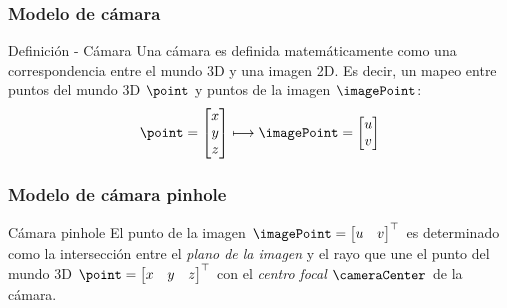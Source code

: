 
\begin{frame}
\frametitle{Modelo de cámara}

\begin{block}{Definición - Cámara}
Una cámara es definida matemáticamente como una correspondencia entre el mundo 3D y una imagen 2D. Es decir, un mapeo entre puntos del mundo 3D $\point$ y puntos de la imagen $\imagePoint$:
\begin{equation}
\point=\begin{bmatrix}x\\
y\\
z
\end{bmatrix}\longmapsto
\imagePoint=\begin{bmatrix}u\\
v
\end{bmatrix}
\end{equation}
\end{block}

\end{frame}


\begin{frame}
\frametitle{Modelo de cámara pinhole}

\begin{block}{Cámara pinhole}
El punto de la imagen $\imagePoint=\begin{bmatrix}u & v\end{bmatrix}^{\top}$ es determinado como la intersección entre el \emph{plano de la imagen} y el rayo que une el punto del mundo 3D $\point=\begin{bmatrix}x & y & z\end{bmatrix}^{\top}$ con el \emph{centro focal} $\cameraCenter$ de la cámara.
\end{block}

\begin{figure}[!htb]
	\centering
	\hfill
\end{figure}

\end{frame}



